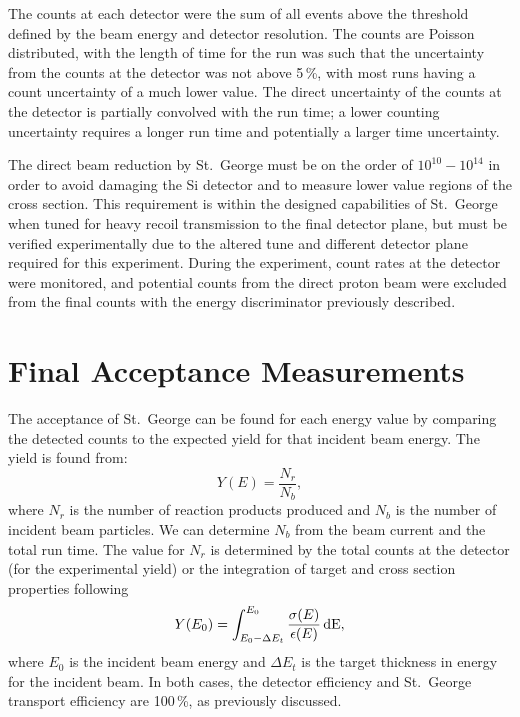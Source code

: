 The counts at each detector were the sum of all events above the
threshold defined by the beam energy and detector resolution. The counts
are Poisson distributed, with the length of time for the run was such
that the uncertainty from the counts at the detector was not above
5\,\%, with most runs having a count uncertainty of a much lower value.
The direct uncertainty of the counts at the detector is partially
convolved with the run time; a lower counting uncertainty requires a
longer run time and potentially a larger time uncertainty.

The direct beam reduction by St.\ George must be on the order of
$10^{10}-10^{14}$ in order to avoid damaging the Si detector and to
measure lower value regions of the cross section. This requirement is
within the designed capabilities of St.\ George when tuned for heavy
recoil transmission to the final detector plane, but must be verified
experimentally due to the altered tune and different detector plane
required for this experiment. During the experiment, count rates at the
detector were monitored, and potential counts from the direct proton
beam were excluded from the final counts with the energy discriminator
previously described.

\section{Final Acceptance Measurements}
\label{sec:final-acceptance-measurements}

The acceptance of St.\ George can be found for each energy value by
comparing the detected counts to the expected yield for that incident
beam energy. The yield is found from:
\begin{equation}
    Y(E) = \frac{N_r}{N_b},
\end{equation}
where $N_r$ is the number of reaction products produced and $N_b$ is the
number of incident beam particles. We can determine $N_b$ from the beam
current and the total run time. The value for $N_r$ is determined by the
total counts at the detector (for the experimental yield) or the
integration of target and cross section properties following
\begin{equation}
    \label{eq:yield}
    Y(E_0) = \int^{E_0}_{E_0 - \Delta E_t} \frac{\sigma(E)}{\epsilon(E)}\,\rm{d}E,
\end{equation}
where $E_0$ is the incident beam energy and $\Delta E_t$ is the target
thickness in energy for the incident beam. In both cases, the detector
efficiency and St.\ George transport efficiency are 100\,\%, as
previously discussed.

